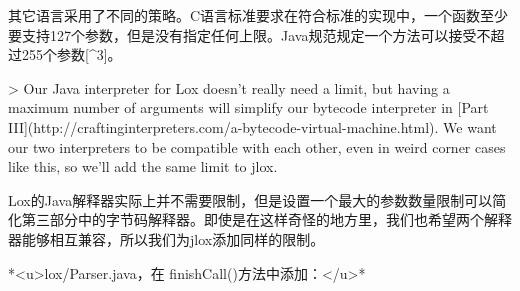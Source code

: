 \documentclass[cn,11pt,chinese]{elegantbook}
\begin{document}
其它语言采用了不同的策略。C语言标准要求在符合标准的实现中，一个函数至少要支持127个参数，但是没有指定任何上限。Java规范规定一个方法可以接受不超过255个参数[^3]。

> Our Java interpreter for Lox doesn’t really need a limit, but having a maximum number of arguments will simplify our bytecode interpreter in [Part III](http://craftinginterpreters.com/a-bytecode-virtual-machine.html). We want our two interpreters to be compatible with each other, even in weird corner cases like this, so we’ll add the same limit to jlox.

Lox的Java解释器实际上并不需要限制，但是设置一个最大的参数数量限制可以简化第三部分中的字节码解释器。即使是在这样奇怪的地方里，我们也希望两个解释器能够相互兼容，所以我们为jlox添加同样的限制。

*<u>lox/Parser.java，在 finishCall()方法中添加：</u>*
\end{document}
